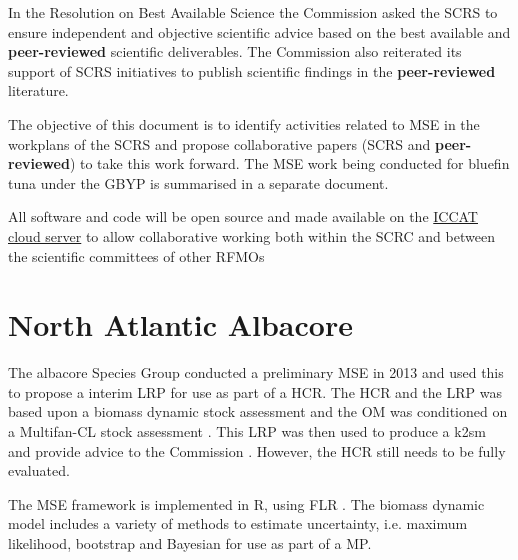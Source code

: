 \documentclass[a4paper,10pt]{article}
\begin{document}
In the Resolution on Best Available Science the Commission asked the \gls{SCRS} to
ensure independent and objective scientific advice based on the best available and \textbf{peer-reviewed} 
scientific deliverables. The Commission also reiterated its support of SCRS initiatives 
to publish scientific findings in the \textbf{peer-reviewed} literature.

The objective of this document is to identify activities related to MSE in the workplans of the SCRS  
and propose collaborative papers (SCRS and \textbf{peer-reviewed}) to take this work forward. 
The MSE work being conducted for bluefin tuna under the GBYP is summarised in a separate document.

All software and code will be open source and made available on the \href{http://rscloud.iccat.int}{ICCAT cloud server} to 
allow collaborative working both within the SCRC and between the scientific committees of other \glspl{RFMO}



\section{North Atlantic Albacore}

The albacore Species Group conducted a preliminary MSE in 2013  and used this to propose a interim LRP for use
as part of a HCR.  
The HCR and the LRP was based upon a biomass dynamic stock assessment  and the \gls{OM} was 
conditioned on a Multifan-CL stock assessment .
This LRP was then used to produce a \gls{k2sm} and provide advice to the Commission . 
However, the HCR still needs to be fully evaluated.

The MSE framework is implemented in R,  using \gls{FLR} . 
The biomass dynamic model includes a variety of methods to estimate uncertainty, i.e. maximum likelihood,
bootstrap and Bayesian  for use as part of a \gls{MP}.
\end{document}
